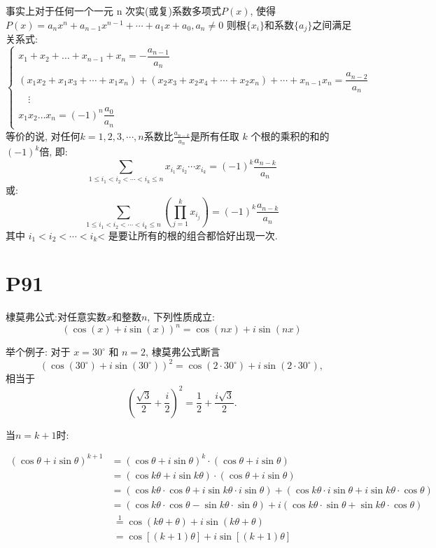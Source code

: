 \documentclass{book}
\begin{document}
    事实上对于任何一个一元 n 次实(或复)系数多项式$P(x)$, 使得$P(x)=a_nx^n  + a_{n-1}x^{n-1} +\cdots + a_1 x+ a_0,a_n\neq 0$
    则根${\displaystyle \{x_{i}\}}$和系数${\displaystyle \{a_{j}\}}$之间满足关系式:
    $$
        \begin{cases} x_1 + x_2 + \dots + x_{n-1} + x_n = -\dfrac{a_{n-1}}{a_{n}}                                                           \\
            (x_1 x_2 + x_1 x_3+\cdots + x_1 x_n) + (x_2x_3 + x_2x_4+\cdots + x_2x_n)+\cdots + x_{n-1}x_n = \dfrac{a_{n-2}}{a_{n}} \\
            {} \quad \vdots                                                                                                       \\ x_1 x_2 \dots x_n = (-1)^n \dfrac{a_0}{a_n}
        \end{cases}
    $$
    等价的说, 对任何$k=1,2,3,\cdots,n$系数比${\displaystyle {\frac {a_{n-k}}{a_{n}}}}$是所有任取 $k$ 个根的乘积的和的${\displaystyle (-1)^{k}}$倍, 即:
    $$\sum_{1\leqslant i_1 < i_2 < \cdots < i_k\leqslant n} x_{i_1}x_{i_2}\cdots x_{i_k}=(-1)^k\frac{a_{n-k}}{a_n}$$
    或:
    $$\sum_{1\leqslant i_1 < i_2 < \cdots < i_k\leqslant n} \left(\prod_{j = 1}^k x_{i_j}\right)=(-1)^k\frac{a_{n-k}}{a_n}$$
    其中 $i_1 < i_2 < \cdots < i_k$< 是要让所有的根的组合都恰好出现一次.
    \section{\textcolor[rgb]{0.11,0.65,0.52}{P91}}
    \begin{boxB}
        棣莫弗公式:对任意实数${\displaystyle x}$和整数${\displaystyle n}$, 下列性质成立: $$( \cos (x) + i \sin (x) )^n = \cos (nx) + i \sin (nx)$$
    \end{boxB}
    举个例子: 对于 ${\displaystyle x=30^{\circ }}$ 和 ${\displaystyle n=2}$, 棣莫弗公式断言 $${\displaystyle \left(\cos(30^{\circ })+i\sin(30^{\circ })\right)^{2}=\cos(2\cdot 30^{\circ })+i\sin(2\cdot 30^{\circ }),}$$相当于$${\displaystyle \left({\frac {\sqrt {3}}{2}}+{\frac {i}{2}}\right)^{2}={\frac {1}{2}}+{\frac {i{\sqrt {3}}}{2}}.}$$

    当$n=k+1$时:

${\displaystyle {\begin{aligned}(\cos \theta +i\sin \theta )^{k+1}&=(\cos \theta +i\sin \theta )^{k}\cdot (\cos \theta +i\sin \theta )\\&=(\cos k\theta +i\sin k\theta )\cdot (\cos \theta +i\sin \theta )\\&=(\cos k\theta \cdot \cos \theta +i\sin k\theta \cdot i\sin \theta )+(\cos k\theta \cdot i\sin \theta +i\sin k\theta \cdot \cos \theta )\\&=(\cos k\theta \cdot \cos \theta -\sin k\theta \cdot \sin \theta )+i(\cos k\theta \cdot \sin \theta +\sin k\theta \cdot \cos \theta )\\&\ {\overset {1}{=}}\cos(k\theta +\theta )+i\sin(k\theta +\theta )\\&\ =\cos[(k+1)\theta ]+i\sin[(k+1)\theta ]\\\end{aligned}}}$
\end{document}
